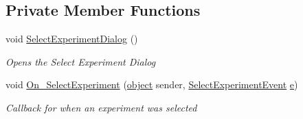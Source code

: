 \subsection*{Private Member Functions}
\begin{DoxyCompactItemize}
\item 
void \hyperlink{class_web_analyzer_1_1_u_i_1_1_interaction_objects_1_1_experiment_wizard_obj_a4a69da48d96c3f49f78ab58ff1f608f8}{Select\+Experiment\+Dialog} ()
\begin{DoxyCompactList}\small\item\em Opens the Select Experiment Dialog \end{DoxyCompactList}\item 
void \hyperlink{class_web_analyzer_1_1_u_i_1_1_interaction_objects_1_1_experiment_wizard_obj_a5c7f45e1b85d3eaa1f2c78e650a64012}{On\+\_\+\+Select\+Experiment} (\hyperlink{_u_i_2_h_t_m_l_resources_2js_2lib_2underscore_8min_8js_aae18b7515bb2bc4137586506e7c0c903}{object} sender, \hyperlink{class_web_analyzer_1_1_events_1_1_select_experiment_event}{Select\+Experiment\+Event} \hyperlink{_u_i_2_h_t_m_l_resources_2js_2lib_2bootstrap_8min_8js_ab5902775854a8b8440bcd25e0fe1c120}{e})
\begin{DoxyCompactList}\small\item\em Callback for when an experiment was selected \end{DoxyCompactList}\end{DoxyCompactItemize}
